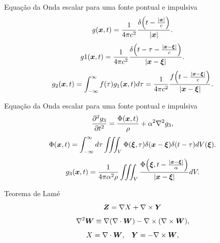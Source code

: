 \documentclass{beamer}
\begin{document}
\begin{frame}{Equação da Onda escalar para uma fonte pontual e impulsiva}
	\begin{equation}
	g(\boldsymbol{x},t) = \frac{1}{4\pi c^2}\frac{\delta\Big(t - \frac{|\boldsymbol{x}|}{c}\Big)}{|\boldsymbol{x}|}. \nonumber
	\end{equation}
	\begin{equation}
	g1(\boldsymbol{x},t) = \frac{1}{4\pi c^2}\frac{\delta\Big(t - \tau - \frac{|\boldsymbol{x}-\boldsymbol{\xi}|}{c}\Big)}{|\boldsymbol{x}-\boldsymbol{\xi}|}. \nonumber
	\end{equation}
	\begin{equation}
	g_2(\boldsymbol{x},t) = \int_{-\infty}^{\infty}f(\tau)g_1(\boldsymbol{x},t)d\tau = \frac{1}{4\pi c^2}\frac{f\Big(t - \frac{|\boldsymbol{x}-\boldsymbol{\xi}|}{c}\Big)}{|\boldsymbol{x}-\boldsymbol{\xi}|}. \nonumber
	\end{equation}
	
\end{frame}

\begin{frame}{Equação da Onda escalar para uma fonte pontual e impulsiva}
	\begin{equation}
	\frac{\partial^2g_3}{\partial{t}^2} = \frac{\Phi(\boldsymbol{x},t)}{\rho} + \alpha^2\nabla^2g_3, \nonumber
	\label{eq_potencial}
	\end{equation} 
	\begin{equation}
	\Phi(\boldsymbol{x},t) = \int_{-\infty}^{\infty}d\tau\iiint_V\Phi(\boldsymbol{\xi},\tau)\delta(\boldsymbol{x}-\boldsymbol{\xi})\delta(t-\tau)dV(\boldsymbol{\xi}). \nonumber
	\end{equation}
	\begin{equation}
	g_3(\boldsymbol{x},t) =  \frac{1}{4\pi \alpha^2\rho}\iiint_V\frac{\Phi\Big(\boldsymbol{\xi},t - \frac{|\boldsymbol{x}-\boldsymbol{\xi}|}{\alpha}\Big)}{|\boldsymbol{x}-\boldsymbol{\xi}|}dV. \nonumber
	\end{equation}
	
\end{frame}

\begin{frame}{Teorema de Lamé}
	\begin{equation}
	\boldsymbol{Z} = \nabla{X} + \nabla\times\boldsymbol{Y} \nonumber
	\end{equation}
	\begin{equation}
	\nabla^2\boldsymbol{W} \equiv \nabla(\nabla\cdot{\boldsymbol{W}}) - \nabla\times(\nabla\times\boldsymbol{W}), \nonumber
	\end{equation}
	\begin{equation}
	X = \nabla\cdot\boldsymbol{W}, \hspace{0.3cm} \boldsymbol{Y} = -\nabla\times\boldsymbol{W}, \nonumber
	\end{equation}
	
\end{frame}
\end{document}

